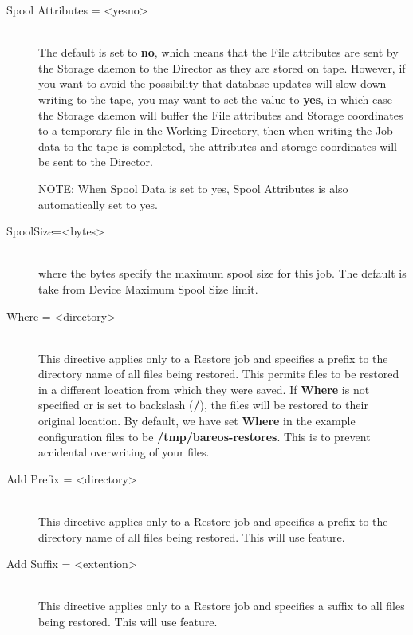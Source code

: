 \begin{description}
\item [Spool Attributes = {\textless}yes{\textbar}no{\textgreater}] \hfill \\
The default is set to {\bf no}, which means that the File attributes are
sent by the Storage daemon to the Director as they are stored on tape.
However, if you want to avoid the possibility that database updates will
slow down writing to the tape, you may want to set the value to {\bf
yes}, in which case the Storage daemon will buffer the File attributes
and Storage coordinates to a temporary file in the Working Directory,
then when writing the Job data to the tape is completed, the attributes
and storage coordinates will be sent to the Director.

NOTE: When Spool Data is set to yes, Spool Attributes is also
automatically set to yes.

\item [SpoolSize={\textless}bytes{\textgreater}] \hfill \\
where the bytes specify the maximum spool size for this job.
The default is take from Device Maximum Spool Size limit.


\item [Where = {\textless}directory{\textgreater}] \hfill \\
This directive applies only to a Restore job and specifies a prefix to
the directory name of all files being restored.  This permits files to
be restored in a different location from which they were saved.  If {\bf
Where} is not specified or is set to backslash ({\bf /}), the files will
be restored to their original location.  By default, we have set {\bf
Where} in the example configuration files to be {\bf
/tmp/bareos-restores}.  This is to prevent accidental overwriting of
your files.

\item [Add Prefix = {\textless}directory{\textgreater}] \hfill \\
\label{confaddprefix}
This directive applies only to a Restore job and specifies a prefix to the
directory name of all files being restored.  This will use  feature.

\item [Add Suffix = {\textless}extention{\textgreater}] \hfill \\
This directive applies only to a Restore job and specifies a suffix to all
files being restored.  This will use 
feature.


\end{description}
